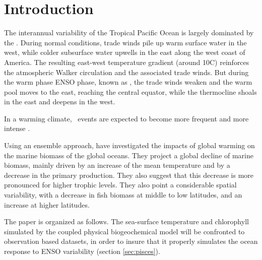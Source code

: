 \section{Introduction}


The interannual variability of the Tropical Pacific Ocean is largely dominated by the \enso . During normal conditions, trade winds pile up warm surface water in the west, while colder subsurface water upwells in the east along the west coast of America. The resulting east-west temperature gradient (around 10\degree C) reinforces the atmospheric Walker circulation and the associated trade winds. But during the warm phase ENSO phase, known as \nino , the trade winds weaken and the warm pool moves to the east, reaching the central equator, while the thermocline shoals in the east and deepens in the west. 

In a warming climate, \nino\ events are expected to become more frequent and more intense \citep{caiENSOGreenhouseWarming2015}.

Using an ensemble approach, \cite{lotzeGlobalEnsembleProjections2019} have investigated the impacts of global warming on the marine biomass of the global oceans. They project a global decline of marine biomass, mainly driven by an increase of the mean temperature and by a decrease in the primary production. They also suggest that this decrease is more pronounced for higher trophic levels. They also point a considerable spatial variability, with a decrease in fish biomass at middle to low latitudes, and an increase at higher latitudes. 

The paper is organized as follows. The sea-surface temperature and chlorophyll simulated by the coupled physical biogeochemical model will be confronted to observation based datasets, in order to insure that it properly simulates the ocean response to ENSO variability (section \ref{sec:pisces}). 

